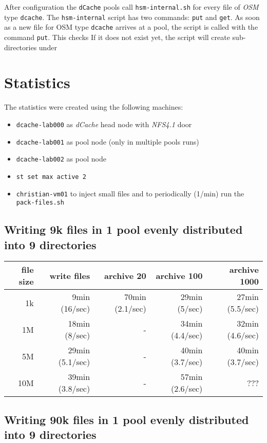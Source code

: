 \documentclass[a4paper,8pt]{scrartcl}
\begin{document}
After configuration the \texttt{dCache} pools call \texttt{hsm-internal.sh} for 
every file of \emph{OSM} type \texttt{dcache}. The \texttt{hsm-internal} script
has two commands: \texttt{put} and \texttt{get}. As soon as a new file for OSM
type \texttt{dcache} arrives at a pool, the script is called with the command 
\texttt{put}. This checks If it does not exist yet, the script will create sub-directories under 

\section{Statistics}
The statistics were created using the following machines:
\begin{itemize}
  \item \texttt{dcache-lab000} as \emph{dCache} head node with \emph{NFS4.1} door
  \item \texttt{dcache-lab001} as pool node (only in multiple pools runs)
  \item \texttt{dcache-lab002} as pool node
  \item \texttt{st set max active 2}
  \item \texttt{christian-vm01} to inject small files and to periodically (1/min) run the \texttt{pack-files.sh}
\end{itemize}

\subsection{Writing 9k files in 1 pool evenly distributed into 9 directories}

\begin{tabular}{|r||r||r|r|r|}
  \hline
  file size & write files  & archive 20 & archive 100 & archive 1000 \\
  \hline
  1k        &  9min (16/sec)  & 70min (2.1/sec) & 29min (5/sec) & 27min (5.5/sec) \\
  \hline
  1M        & 18min (8/sec)   &        -        & 34min (4.4/sec) & 32min (4.6/sec) \\
  \hline
  5M        & 29min (5.1/sec) &        -        & 40min (3.7/sec) & 40min (3.7/sec) \\
  \hline
  10M       & 39min (3.8/sec) &        -        & 57min (2.6/sec) & ??? \\
  \hline
\end{tabular}

\subsection{Writing 90k files in 1 pool evenly distributed into 9 directories}
\end{document}
